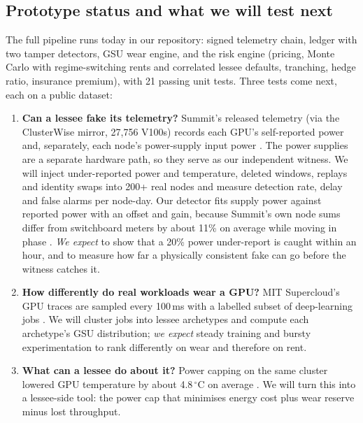\documentclass[10pt]{article}
\begin{document}
\subsection{Prototype status and what we will test next}
The full pipeline runs today in our repository: signed telemetry chain, ledger with two tamper detectors, GSU wear engine, and the risk engine (pricing, Monte Carlo with regime-switching rents and correlated lessee defaults, tranching, hedge ratio, insurance premium), with 21 passing unit tests. Three tests come next, each on a public dataset:
\begin{enumerate}
\item \textbf{Can a lessee fake its telemetry?} Summit's released telemetry (via the ClusterWise mirror, 27,756 V100s) records each GPU's self-reported power and, separately, each node's power-supply input power \cite{shin,clusterwise}. The power supplies are a separate hardware path, so they serve as our independent witness. We will inject under-reported power and temperature, deleted windows, replays and identity swaps into 200+ real nodes and measure detection rate, delay and false alarms per node-day. Our detector fits supply power against reported power with an offset and gain, because Summit's own node sums differ from switchboard meters by about 11\% on average while moving in phase \cite{shin}. \emph{We expect} to show that a 20\% power under-report is caught within an hour, and to measure how far a physically consistent fake can go before the witness catches it.
\item \textbf{How differently do real workloads wear a GPU?} MIT Supercloud's GPU traces are sampled every 100\,ms with a labelled subset of deep-learning jobs \cite{supercloud}. We will cluster jobs into lessee archetypes and compute each archetype's GSU distribution; \emph{we expect} steady training and bursty experimentation to rank differently on wear and therefore on rent.
\item \textbf{What can a lessee do about it?} Power capping on the same cluster lowered GPU temperature by about 4.8\,$^\circ$C on average \cite{zhao}. We will turn this into a lessee-side tool: the power cap that minimises energy cost plus wear reserve minus lost throughput.
\end{enumerate}

\end{document}
